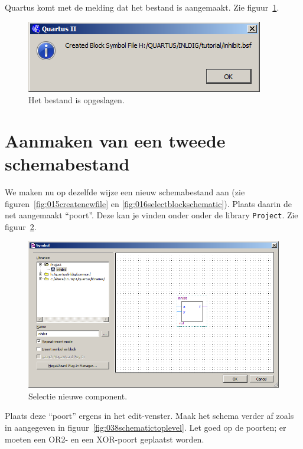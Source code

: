 \documentclass[a4paper,12pt,fleqn,twoside]{book}
\def\tutpicscale{0.455}
\newcommand{\naam}[1]{\texttt{#1}}
\begin{document}
Quartus komt met de melding dat het bestand is aangemaakt.
Zie figuur~\ref{fig:035bsffilecreated}.

\begin{figure}[H]
\centering
\includegraphics[scale=\tutpicscale]{035bsffilecreated}
\caption{Het bestand is opgeslagen.}
\label{fig:035bsffilecreated}
\end{figure}


\section{Aanmaken van een tweede schemabestand}
\label{sec:aanmakenvaneentweedeschemabestand}
We maken nu op dezelfde wijze een nieuw schemabestand aan (zie
figuren~\ref{fig:015createnewfile} en \ref{fig:016selectblockschematic}).
Plaats daarin de net aangemaakt ``poort''. Deze kan je vinden onder onder
de library \naam{Project}. Zie figuur~\ref{fig:037selectinhibit}.
 
\begin{figure}[H]
\centering
\includegraphics[scale=\tutpicscale]{037selectinhibit}
\caption{Selectie nieuwe component.}
\label{fig:037selectinhibit}
\end{figure}

Plaats deze ``poort'' ergens in het edit-venster. Maak het schema verder af
zoals in aangegeven in figuur~\ref{fig:038schematictoplevel}. Let goed op de
poorten; er moeten een OR2- en een XOR-poort geplaatst worden. 
 
\end{document}

